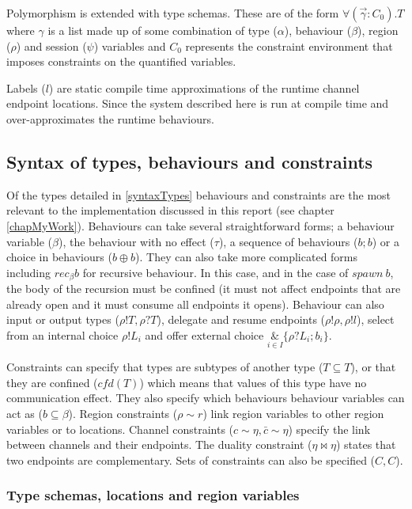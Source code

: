 Polymorphism is extended with type schemas. These are of the form $\forall(\overrightarrow{\gamma}:C_0).T$ where $\gamma$ is a list made up of some combination of type ($\alpha$), behaviour ($\beta$), region ($\rho$) and session ($\psi$) variables and $C_0$ represents the constraint environment that imposes constraints on the quantified variables. 

Labels ($l$) are static compile time approximations of the runtime channel endpoint locations. Since the system described here is run at compile time and over-approximates the runtime behaviours. 

\subsection{Syntax of types, behaviours and constraints}

Of the types detailed in \ref{syntaxTypes} behaviours and constraints are the most relevant to the implementation discussed in this report (see chapter \ref{chapMyWork}). Behaviours can take several straightforward forms; a behaviour variable ($\beta$), the behaviour with no effect ($\tau$), a sequence of behaviours ($b;b$) or a choice in behaviours ($b \oplus b$). They can also take more complicated forms including $rec_\beta b$ for recursive behaviour. In this case, and in the case of $spawn \ b$, the body of the recursion must be confined (it must not affect endpoints that are already open and it must consume all endpoints it opens). Behaviour can also input or output types ($\rho!T, \rho?T$), delegate and resume endpoints ($\rho!\rho, \rho!l$), select from an internal choice $\rho ! L_i$ and offer external choice $\underset{i \in I}{\&}\{\rho?L_i ; b_i\}$.

Constraints can specify that types are subtypes of another type ($T\subseteq T$), or that they are confined ($cfd(T)$) which means that values of this type have no communication effect. They also specify which behaviours behaviour variables can act as ($b\subseteq \beta$). Region constraints ($\rho \sim r$) link region variables to other region variables or to locations. Channel constraints ($c\sim\eta, \bar{c}\sim\eta$) specify the link between channels and their endpoints. The duality constraint ($\eta \bowtie \eta$) states that two endpoints are complementary. Sets of constraints can also be specified ($C,C$). 


\subsubsection{Type schemas, locations and region variables} 
\label{secTs}

